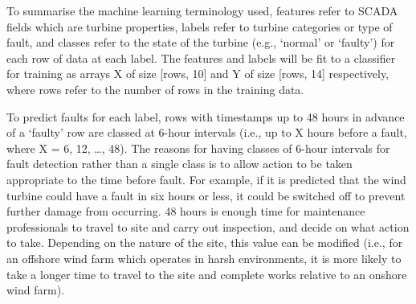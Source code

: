 To summarise the machine learning terminology used, features refer to SCADA fields which are turbine properties, labels refer to turbine categories or type of fault, and classes refer to the state of the turbine (e.g., `normal' or `faulty') for each row of data at each label. The features and labels will be fit to a classifier for training as arrays X of size [rows, 10] and Y of size [rows, 14] respectively, where rows refer to the number of rows in the training data.

To predict faults for each label, rows with timestamps up to 48 hours in advance of a `faulty' row are classed at 6-hour intervals (i.e., up to X hours before a fault, where X = 6, 12, …, 48). The reasons for having classes of 6-hour intervals for fault detection rather than a single class is to allow action to be taken appropriate to the time before fault. For example, if it is predicted that the wind turbine could have a fault in six hours or less, it could be switched off to prevent further damage from occurring. 48 hours is enough time for maintenance professionals to travel to site and carry out inspection, and decide on what action to take. Depending on the nature of the site, this value can be modified (i.e., for an offshore wind farm which operates in harsh environments, it is more likely to take a longer time to travel to the site and complete works relative to an onshore wind farm).

